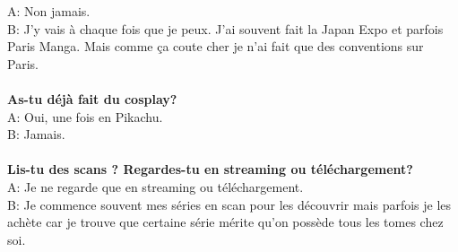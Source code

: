 A: Non jamais.\\
B: J'y vais à chaque fois que je peux. J'ai souvent fait la Japan Expo et
parfois Paris Manga. Mais comme ça coute cher je n'ai fait que des conventions
sur Paris.\\
\\
\textbf{As-tu déjà fait du cosplay?}\\
A: Oui, une fois en Pikachu.\\
B: Jamais.\\
\\
\textbf{Lis-tu des scans ? Regardes-tu en streaming ou téléchargement?}\\
A: Je ne regarde que en streaming ou téléchargement.\\
B: Je commence souvent mes séries en scan pour les découvrir mais parfois je
les achète car je trouve que certaine série mérite qu'on possède tous les tomes
chez soi.
